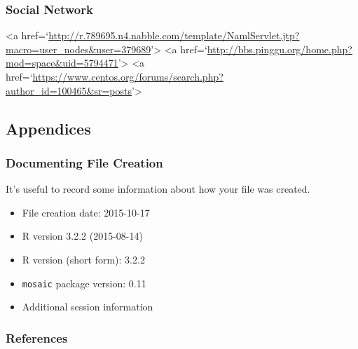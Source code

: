 \documentclass[]{article}
\providecommand{\tightlist}{%
  \setlength{\itemsep}{0pt}\setlength{\parskip}{0pt}}
\begin{document}
\subsubsection{Social Network}\label{social-network}

 \textless{}a
href=`\url{http://r.789695.n4.nabble.com/template/NamlServlet.jtp?macro=user_nodes\&user=379689}'\textgreater{}
\textless{}a
href=`\url{http://bbs.pinggu.org/home.php?mod=space\&uid=5794471}'\textgreater{}
\textless{}a
href=`\url{https://www.centos.org/forums/search.php?author_id=100465\&sr=posts}'\textgreater{}

\subsection{Appendices}\label{appendices}

\subsubsection{Documenting File
Creation}\label{documenting-file-creation}

It's useful to record some information about how your file was created.

\begin{itemize}
\tightlist
\item
  File creation date: 2015-10-17
\item
  R version 3.2.2 (2015-08-14)
\item
  R version (short form): 3.2.2
\item
  \texttt{mosaic} package version: 0.11
\item
  Additional session information
\end{itemize}

\subsubsection{References}\label{references}
\end{document}
